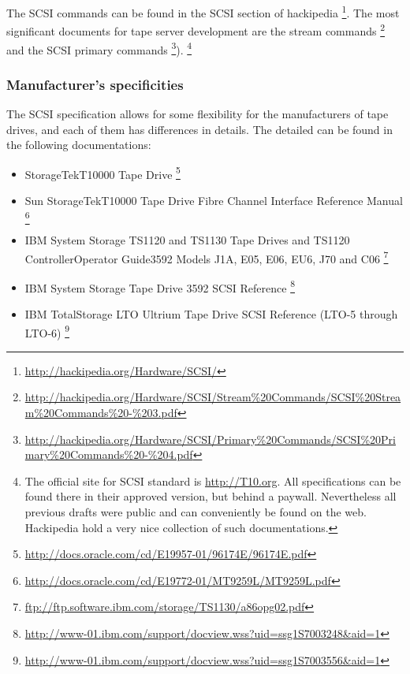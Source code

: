 The SCSI commands can be found in the SCSI section of hackipedia
      \footnote{ \href{http://hackipedia.org/Hardware/SCSI/}{http://hackipedia.org/Hardware/SCSI/} }.
 The most significant documents for tape server development are the stream commands
      \footnote{ \href{http://hackipedia.org/Hardware/SCSI/Stream\%20Commands/SCSI\%20Stream\%20Commands\%20-\%203.pdf}
                      {http://hackipedia.org/Hardware/SCSI/Stream\%20Commands/SCSI\%20Stream\%20Commands\%20-\%203.pdf} }
 and the SCSI primary commands
      \footnote{ \href{http://hackipedia.org/Hardware/SCSI/Primary\%20Commands/SCSI\%20Primary\%20Commands\%20-\%204.pdf}
                      {http://hackipedia.org/Hardware/SCSI/Primary\%20Commands/SCSI\%20Primary\%20Commands\%20-\%204.pdf} }).
      \footnote{The official site for SCSI standard is \href{http://T10.org}{http://T10.org}. All specifications
      can be found there in their approved version, but behind a paywall. Nevertheless all previous drafts were
      public and can conveniently be found on the web. Hackipedia hold a very nice collection of such
      documentations.}

\subsubsection{Manufacturer's specificities}
\label{Manufacturer's specificities}
The SCSI specification allows for some flexibility for the manufacturers of tape drives, and 
each of them has differences in details. The detailed can be found in the following documentations:

\begin{itemize}
\item{}StorageTek\texttrademark T10000 Tape Drive
       \footnote{ \href{http://docs.oracle.com/cd/E19957-01/96174E/96174E.pdf}
                       {http://docs.oracle.com/cd/E19957-01/96174E/96174E.pdf} }
\item{}Sun StorageTek\texttrademark T10000 Tape Drive Fibre Channel Interface Reference Manual
       \footnote{ \href{http://docs.oracle.com/cd/E19772-01/MT9259L/MT9259L.pdf}
                       {http://docs.oracle.com/cd/E19772-01/MT9259L/MT9259L.pdf} }
\item{}IBM System Storage TS1120 and TS1130 Tape Drives and TS1120 ControllerOperator Guide3592 Models J1A, E05, E06, EU6, J70 and C06
       \footnote{ \href{ftp://ftp.software.ibm.com/storage/TS1130/a86opg02.pdf}
                       {ftp://ftp.software.ibm.com/storage/TS1130/a86opg02.pdf} }
\item{}IBM System Storage Tape Drive 3592 SCSI Reference
       \footnote{ \href{http://www-01.ibm.com/support/docview.wss?uid=ssg1S7003248\&aid=1}
                       {http://www-01.ibm.com/support/docview.wss?uid=ssg1S7003248\&aid=1} }
\item{}IBM TotalStorage LTO Ultrium Tape Drive SCSI Reference  (LTO-5 through LTO-6)
       \footnote{ \href{http://www-01.ibm.com/support/docview.wss?uid=ssg1S7003556\&aid=1}
                       {http://www-01.ibm.com/support/docview.wss?uid=ssg1S7003556\&aid=1} }
\end{itemize}

